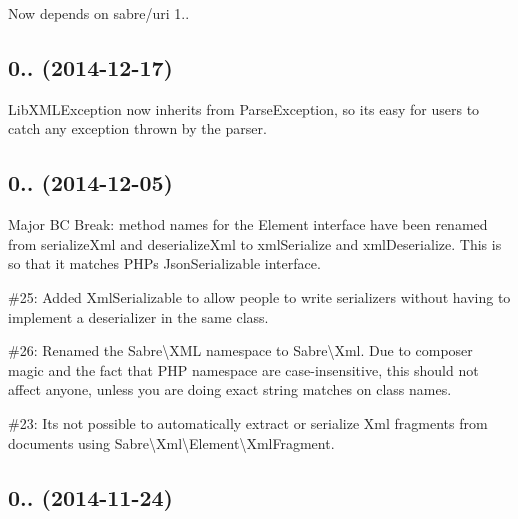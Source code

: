 \begin{DoxyItemize}
\item Now depends on sabre/uri 1..
\end{DoxyItemize}

\subsection*{0.. (2014-\/12-\/17) }


\begin{DoxyItemize}
\item Lib\+X\+M\+L\+Exception now inherits from Parse\+Exception, so it\textquotesingle{}s easy for users to catch any exception thrown by the parser.
\end{DoxyItemize}

\subsection*{0.. (2014-\/12-\/05) }


\begin{DoxyItemize}
\item Major BC Break\+: method names for the Element interface have been renamed from {\ttfamily serialize\+Xml} and {\ttfamily deserialize\+Xml} to {\ttfamily xml\+Serialize} and {\ttfamily xml\+Deserialize}. This is so that it matches P\+HP\textquotesingle{}s {\ttfamily Json\+Serializable} interface.
\item \#25\+: Added {\ttfamily Xml\+Serializable} to allow people to write serializers without having to implement a deserializer in the same class.
\item \#26\+: Renamed the {\ttfamily Sabre\textbackslash{}X\+ML} namespace to {\ttfamily Sabre\textbackslash{}Xml}. Due to composer magic and the fact that P\+HP namespace are case-\/insensitive, this should not affect anyone, unless you are doing exact string matches on class names.
\item \#23\+: It\textquotesingle{}s not possible to automatically extract or serialize Xml fragments from documents using {\ttfamily Sabre\textbackslash{}Xml\textbackslash{}Element\textbackslash{}Xml\+Fragment}.
\end{DoxyItemize}

\subsection*{0.. (2014-\/11-\/24) }


